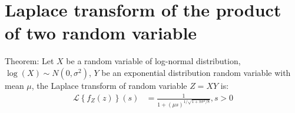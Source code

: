 %
%
%
%
\section*{ Laplace transform of the product of two random variable}
\label{annexe:laplace-transform-exponential-lognormal}
Theorem: Let $X$ be a random variable of log-normal distribution, $\log(X) \sim N\left( 0, \sigma^2\right)$, $Y$ be an exponential distribution random variable with mean $\mu$, the Laplace transform of random variable $Z=XY$ is:
\begin{align}
	\label{eq:theorem_C}
	\mathcal{L}\left\lbrace f_Z\left( z\right) \right\rbrace \left(  s\right) &= \frac{1}{1 + (\mu s)^{1/\sqrt{1 +\pi \sigma^2/8}}}, s > 0
\end{align}

